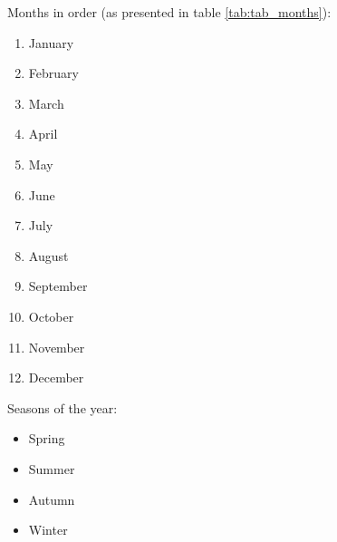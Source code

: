  
 \vspace{1.0cm}
    
 Months in order (as presented in table \ref{tab:tab_months}):
\begin{enumerate}
    \item January
    \item February
    \item March
    \item April
    \item May
    \item June
    \item July
    \item August
    \item September
    \item October
    \item November
    \item December
    
\end{enumerate}

\vspace{2.0cm}
Seasons of the year:

\begin{itemize}
\renewcommand{\labelitemi}{$-$}
    \item Spring
    \item Summer
    \item Autumn
    \item Winter
\end{itemize}






 






